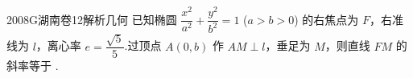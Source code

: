 
\begin{problem}{2008}{G}{湖南卷}{12}{解析几何}
已知椭圆 $\dfrac{x^2}{a^2}+\dfrac{y^2}{b^2}=1$ ($a>b>0$) 的右焦点为 $F$，右准线为 $l$，离心率 $e=\dfrac{\sqrt{5}}{5}$.过顶点 $A(0,b)$ 作 $AM\perp l$，垂足为 $M$，则直线 $FM$ 的斜率等于 \underline{\hspace{4em}}.
\end{problem}

\begin{answer}

\end{answer}

\begin{solutions}

\end{solutions}